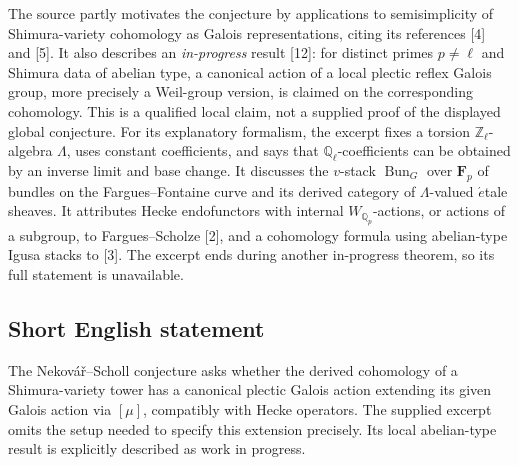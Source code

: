 \documentclass[11pt]{article}
\newcommand{\Z}{\mathbb{Z}}
\newcommand{\Q}{\mathbb{Q}}
\begin{document}
The source partly motivates the conjecture by applications to semisimplicity of Shimura-variety cohomology as Galois representations, citing its references [4] and [5]. It also describes an \emph{in-progress} result [12]: for distinct primes \(p\ne\ell\) and Shimura data of abelian type, a canonical action of a local plectic reflex Galois group, more precisely a Weil-group version, is claimed on the corresponding cohomology. This is a qualified local claim, not a supplied proof of the displayed global conjecture. For its explanatory formalism, the excerpt fixes a torsion \(\Z_\ell\)-algebra \(\Lambda\), uses constant coefficients, and says that \(\Q_\ell\)-coefficients can be obtained by an inverse limit and base change. It discusses the \(v\)-stack \(\operatorname{Bun}_G\) over \(\mathbf F_p\) of bundles on the Fargues--Fontaine curve and its derived category of \(\Lambda\)-valued \(\acute{e}\)tale sheaves. It attributes Hecke endofunctors with internal \(W_{\Q_p}\)-actions, or actions of a subgroup, to Fargues--Scholze [2], and a cohomology formula using abelian-type Igusa stacks to [3]. The excerpt ends during another in-progress theorem, so its full statement is unavailable.
\subsection{Short English statement}
The Nekov\'a\v{r}--Scholl conjecture asks whether the derived cohomology of a Shimura-variety tower has a canonical plectic Galois action extending its given Galois action via \([\mu]\), compatibly with Hecke operators. The supplied excerpt omits the setup needed to specify this extension precisely. Its local abelian-type result is explicitly described as work in progress.
\end{document}
